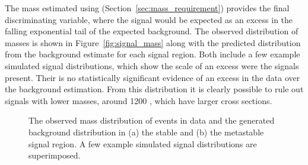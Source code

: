 The mass estimated using \dedx (Section~\ref{sec:mass_requirement}) provides the final discriminating variable, where the signal would be expected as an excess in the falling exponential tail of the expected background.
The observed distribution of masses is shown in Figure~\ref{fig:signal_mass} along with the predicted distribution from the background estimate for each signal region.
Both include a few example simulated signal distributions, which show the scale of an excess were the \rhadron signals present.
Their is no statistically significant evidence of an excess in the data over the background estimation.
From this distribution it is clearly possible to rule out signals with lower masses, around 1200 \GeV, which have larger cross sections.

\begin{figure}
\caption{The observed mass distribution of events in data and the generated background distribution in (a) the stable and (b) the metastable signal region. A few example simulated signal distributions are superimposed.}
\end{figure}

